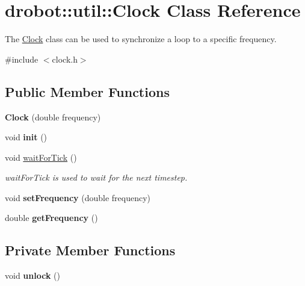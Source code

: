 \hypertarget{classdrobot_1_1util_1_1Clock}{\section{drobot\-:\-:util\-:\-:Clock Class Reference}
\label{classdrobot_1_1util_1_1Clock}
}


The \hyperlink{classdrobot_1_1util_1_1Clock}{Clock} class can be used to synchronize a loop to a specific frequency.  




{\ttfamily \#include $<$clock.\-h$>$}

\subsection*{Public Member Functions}
\begin{DoxyCompactItemize}
\item 
\hypertarget{classdrobot_1_1util_1_1Clock_abbb34db76f1b1bdc73f4da74233df96e}{{\bfseries Clock} (double frequency)}\label{classdrobot_1_1util_1_1Clock_abbb34db76f1b1bdc73f4da74233df96e}

\item 
\hypertarget{classdrobot_1_1util_1_1Clock_a16c9d681c2d95e3cf3a8566e786eef4c}{void {\bfseries init} ()}\label{classdrobot_1_1util_1_1Clock_a16c9d681c2d95e3cf3a8566e786eef4c}

\item 
void \hyperlink{classdrobot_1_1util_1_1Clock_a7b9b7059c83a69a3805730e4101292ce}{wait\-For\-Tick} ()
\begin{DoxyCompactList}\small\item\em wait\-For\-Tick is used to wait for the next timestep. \end{DoxyCompactList}\item 
\hypertarget{classdrobot_1_1util_1_1Clock_a39c8b68b1d807ba60253e72b02a2ee23}{void {\bfseries set\-Frequency} (double frequency)}\label{classdrobot_1_1util_1_1Clock_a39c8b68b1d807ba60253e72b02a2ee23}

\item 
\hypertarget{classdrobot_1_1util_1_1Clock_af476d9c0904776c9457395b70385fab0}{double {\bfseries get\-Frequency} ()}\label{classdrobot_1_1util_1_1Clock_af476d9c0904776c9457395b70385fab0}

\end{DoxyCompactItemize}
\subsection*{Private Member Functions}
\begin{DoxyCompactItemize}
\item 
\hypertarget{classdrobot_1_1util_1_1Clock_a5fe7640381b84529990f33a221770000}{void {\bfseries unlock} ()}\label{classdrobot_1_1util_1_1Clock_a5fe7640381b84529990f33a221770000}

\end{DoxyCompactItemize}
